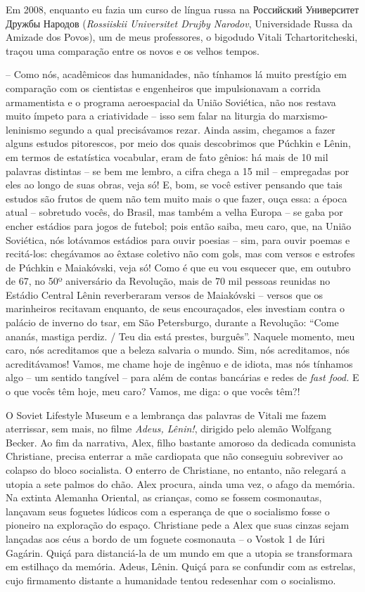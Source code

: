 Em 2008, enquanto eu fazia um curso de língua russa na Российский
Университет Дружбы Народов (\emph{Rossiiskii Universitet Drujby
Narodov}, Universidade Russa da Amizade dos Povos), um de meus
professores, o bigodudo Vitali Tchartoritcheski, traçou uma comparação
entre os novos e os velhos tempos.

-- Como nós, acadêmicos das humanidades, não tínhamos lá muito prestígio
em comparação com os cientistas e engenheiros que impulsionavam a
corrida armamentista e o programa aeroespacial da União Soviética, não
nos restava muito ímpeto para a criatividade -- isso sem falar na
liturgia do marxismo-leninismo segundo a qual precisávamos rezar. Ainda
assim, chegamos a fazer alguns estudos pitorescos, por meio dos quais
descobrimos que Púchkin e Lênin, em termos de estatística vocabular,
eram de fato gênios: há mais de 10 mil palavras distintas -- se bem me
lembro, a cifra chega a 15 mil -- empregadas por eles ao longo de suas
obras, veja só! E, bom, se você estiver pensando que tais estudos são
frutos de quem não tem muito mais o que fazer, ouça essa: a época atual
-- sobretudo vocês, do Brasil, mas também a velha Europa -- se gaba por
encher estádios para jogos de futebol; pois então saiba, meu caro, que,
na União Soviética, nós lotávamos estádios para ouvir poesias -- sim,
para ouvir poemas e recitá-los: chegávamos ao êxtase coletivo não com
gols, mas com versos e estrofes de Púchkin e Maiakóvski, veja só! Como é
que eu vou esquecer que, em outubro de 67, no 50º aniversário da
Revolução, mais de 70 mil pessoas reunidas no Estádio Central Lênin
reverberaram versos de Maiakóvski -- versos que os marinheiros recitavam
enquanto, de seus encouraçados, eles investiam contra o palácio de
inverno do tsar, em São Petersburgo, durante a Revolução: ``Come ananás,
mastiga perdiz. / Teu dia está prestes, burguês''. Naquele momento, meu
caro, nós acreditamos que a beleza salvaria o mundo. Sim, nós
acreditamos, nós acreditávamos! Vamos, me chame hoje de ingênuo e de
idiota, mas nós tínhamos algo -- um sentido tangível -- para além de
contas bancárias e redes de \emph{fast food.} E o que vocês têm hoje,
meu caro? Vamos, me diga: o que vocês têm?!

O Soviet Lifestyle Museum e a lembrança das palavras de Vitali me fazem
aterrissar, sem mais, no filme \emph{Adeus, Lênin!}, dirigido pelo
alemão Wolfgang Becker. Ao fim da narrativa, Alex, filho bastante
amoroso da dedicada comunista Christiane, precisa enterrar a mãe
cardiopata que não conseguiu sobreviver ao colapso do bloco socialista.
O enterro de Christiane, no entanto, não relegará a utopia a sete palmos
do chão. Alex procura, ainda uma vez, o afago da memória. Na extinta
Alemanha Oriental, as crianças, como se fossem cosmonautas, lançavam
seus foguetes lúdicos com a esperança de que o socialismo fosse o
pioneiro na exploração do espaço. Christiane pede a Alex que suas cinzas
sejam lançadas aos céus a bordo de um foguete cosmonauta -- o Vostok 1
de Iúri Gagárin. Quiçá para distanciá-la de um mundo em que a utopia se
transformara em estilhaço da memória. Adeus, Lênin. Quiçá para se
confundir com as estrelas, cujo firmamento distante a humanidade tentou
redesenhar com o socialismo.

